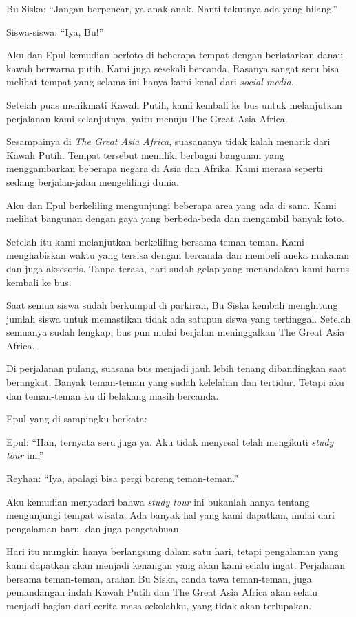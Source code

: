 Bu Siska: ``Jangan berpencar, ya anak-anak. Nanti takutnya ada yang hilang.''


Siswa-siswa: ``Iya, Bu!''

Aku dan Epul kemudian berfoto di beberapa tempat dengan berlatarkan danau kawah berwarna putih. Kami juga sesekali bercanda. Rasanya sangat seru bisa melihat tempat yang selama ini hanya kami kenal dari \textit{social media}.


Setelah puas menikmati Kawah Putih, kami kembali ke bus untuk melanjutkan perjalanan kami selanjutnya, yaitu menuju The Great Asia Africa.


Sesampainya di \textit{The Great Asia Africa}, suasananya tidak kalah menarik dari Kawah Putih. Tempat tersebut memiliki berbagai bangunan yang menggambarkan beberapa negara di Asia dan Afrika. Kami merasa seperti sedang berjalan-jalan mengelilingi dunia.


Aku dan Epul berkeliling mengunjungi beberapa area yang ada di sana. Kami melihat bangunan dengan gaya yang berbeda-beda dan mengambil banyak foto.


Setelah itu kami melanjutkan berkeliling bersama teman-teman. Kami menghabiskan waktu yang tersisa dengan bercanda dan membeli aneka makanan dan juga aksesoris. Tanpa terasa, hari sudah gelap yang menandakan kami harus kembali ke bus.


Saat semua siswa sudah berkumpul di parkiran, Bu Siska kembali menghitung jumlah siswa untuk memastikan tidak ada satupun siswa yang tertinggal. Setelah semuanya sudah lengkap, bus pun mulai berjalan meninggalkan The Great Asia Africa.


Di perjalanan pulang, suasana bus menjadi jauh lebih tenang dibandingkan saat berangkat. Banyak teman-teman yang sudah kelelahan dan tertidur. Tetapi aku dan teman-teman ku di belakang masih bercanda.


Epul yang di sampingku berkata:


Epul: ``Han, ternyata seru juga ya. Aku tidak menyesal telah mengikuti \textit{study tour} ini.''


Reyhan: ``Iya, apalagi bisa pergi bareng teman-teman.''

Aku kemudian menyadari bahwa \textit{study tour} ini bukanlah hanya tentang mengunjungi tempat wisata. Ada banyak hal yang kami dapatkan, mulai dari pengalaman baru, dan juga pengetahuan.


Hari itu mungkin hanya berlangsung dalam satu hari, tetapi pengalaman yang kami dapatkan akan menjadi kenangan yang akan kami selalu ingat. Perjalanan bersama teman-teman, arahan Bu Siska, canda tawa teman-teman, juga pemandangan indah Kawah Putih dan The Great Asia Africa akan selalu menjadi bagian dari cerita masa sekolahku, yang tidak akan terlupakan.


\jedahias
